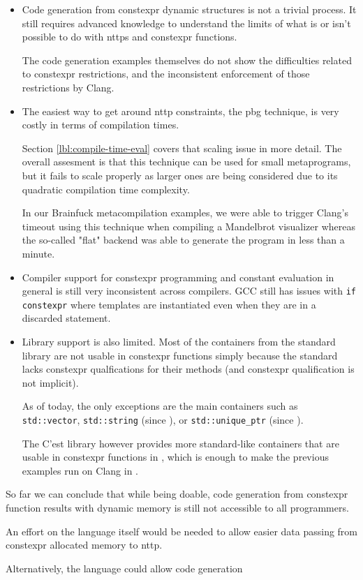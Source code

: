 \documentclass[../main]{subfiles}
\begin{document}
\begin{itemize}

\item
Code generation from \gls{constexpr} dynamic structures is not a trivial process.
It still requires advanced \cpp knowledge to understand the limits of what
is or isn't possible to do with \glspl{nttp} and \gls{constexpr} functions.

The code generation examples themselves do not show the difficulties related to
\cpp \gls{constexpr} restrictions, and the inconsistent enforcement
of those restrictions by Clang.

\item
The easiest way to get around \gls{nttp} constraints, \ie the \gls{pbg}
technique, is very costly in terms of compilation times.

Section \ref{lbl:compile-time-eval} covers that scaling issue in more detail.
The overall assesment is that this technique can be used for small metaprograms,
but it fails to scale properly as larger ones are being considered
due to its quadratic compilation time complexity.

In our Brainfuck metacompilation examples, we were able to trigger Clang's
timeout using this technique when compiling a Mandelbrot visualizer
whereas the so-called "flat" backend was able to generate the program in less
than a minute.

\item
Compiler support for \gls{constexpr} programming and constant evaluation in general
is still very inconsistent across compilers. GCC still has issues with
\lstinline{if constexpr} where templates are instantiated even when they are
in a discarded statement.

\item
Library support is also limited.
Most of the containers from the \cpp standard library are not usable in
\gls{constexpr} functions simply because the \cpp standard lacks \gls{constexpr}
qualfications for their methods (and \gls{constexpr} qualification is not implicit).

As of today, the only exceptions are the main containers such as
\lstinline{std::vector}, \lstinline{std::string} (since ),
or \lstinline{std::unique_ptr} (since ).

The C'est \cite{cest} library however provides more standard-like containers
that are usable in \gls{constexpr} functions in , which is enough to make
the previous examples run on Clang in .

\end{itemize}

So far we can conclude that while being doable, code generation from \gls{constexpr}
function results with dynamic memory is still not accessible to all \cpp
programmers.

An effort on the language itself would be needed to allow easier data passing
from \gls{constexpr} allocated memory to \gls{nttp}.

Alternatively, the language could allow code generation
\end{document}
